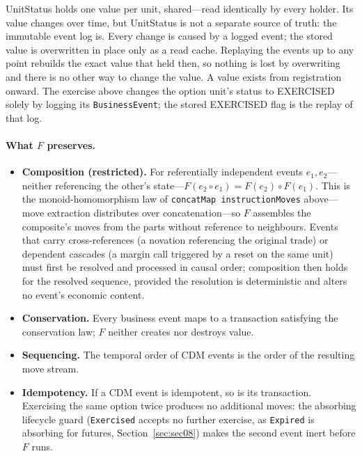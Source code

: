 \begin{remark}
UnitStatus holds one value per unit, shared---read identically by every holder. Its value changes over time, but UnitStatus is not a separate source of truth: the immutable event log is. Every change is caused by a logged event; the stored value is overwritten in place only as a read cache. Replaying the events up to any point rebuilds the exact value that held then, so nothing is lost by overwriting and there is no other way to change the value. A value exists from registration onward. The exercise above changes the option unit's status to EXERCISED solely by logging its \texttt{BusinessEvent}; the stored EXERCISED flag is the replay of that log.
\end{remark}

\paragraph{What \texorpdfstring{$F$}{F} preserves.}
\begin{itemize}[nosep]
\item \textbf{Composition (restricted).} For referentially independent events $e_1, e_2$---neither referencing the other's state---$F(e_2 \circ e_1) = F(e_2) \circ F(e_1)$. This is the monoid-homomorphism law of \texttt{concatMap instructionMoves} above---move extraction distributes over concatenation---so $F$ assembles the composite's moves from the parts without reference to neighbours. Events that carry cross-references (a novation referencing the original trade) or dependent cascades (a margin call triggered by a reset on the same unit) must first be resolved and processed in causal order; composition then holds for the resolved sequence, provided the resolution is deterministic and alters no event's economic content.
\item \textbf{Conservation.} Every business event maps to a transaction satisfying the conservation law; $F$ neither creates nor destroys value.
\item \textbf{Sequencing.} The temporal order of CDM events is the order of the resulting move stream.
\item \textbf{Idempotency.} If a CDM event is idempotent, so is its transaction. Exercising the same option twice produces no additional moves: the absorbing lifecycle guard (\texttt{Exercised} accepts no further exercise, as \texttt{Expired} is absorbing for futures, Section~\ref{sec:sec08}) makes the second event inert before $F$ runs.
\end{itemize}

